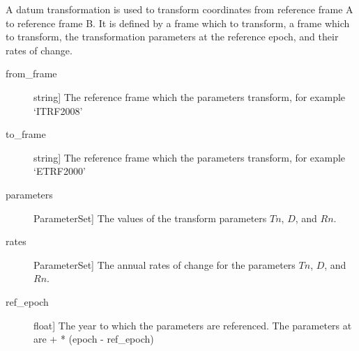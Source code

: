 \documentclass[a4paper,10pt,english]{sphinxmanual}
\begin{document}

\begin{fulllineitems}
\label{\detokenize{api-docs:etrsitrs.datumtransformation.DatumTransformation}}
A datum transformation is used to transform coordinates from
reference frame A to reference frame B. It is defined by a frame
 which to transform, a frame  which to transform, the
transformation parameters at the reference epoch, and their rates
of change.

\begin{description}
\item[{from\_frame}] \leavevmode{[}string{]}
The reference frame  which the parameters transform, for
example ‘ITRF2008’

\item[{to\_frame}] \leavevmode{[}string{]}
The reference frame  which the parameters transform, for
example ‘ETRF2000’

\item[{parameters}] \leavevmode{[}ParameterSet{]}
The values of the transform parameters \(Tn\), \(D\),
and \(Rn\).

\item[{rates}] \leavevmode{[}ParameterSet{]}
The annual rates of change for the parameters \(Tn\),
\(D\), and \(Rn\).

\item[{ref\_epoch}] \leavevmode{[}float{]}
The year to which the parameters are referenced. The
parameters at  are  +  *
(epoch - ref\_epoch)

\end{description}



\end{fulllineitems}
\end{document}
